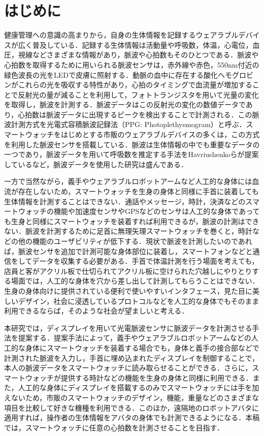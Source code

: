 \documentclass[Japanese,noauthor]{dicomopapers}
\begin{document}
\section{はじめに}
\label{introduction}
健康管理への意識の高まりから，自身の生体情報を記録するウェアラブルデバイスが広く普及している．記録する生体情報は活動量や呼吸数，体温，心電位，血圧，視線などさまざまな情報があり，脈波や心拍数もそのひとつである．脈波や心拍数を取得するために用いられる脈波センサは，赤外線や赤色，550nm付近の緑色波長の光をLEDで皮膚に照射する．動脈の血中に存在する酸化ヘモグロビンがこれらの光を吸収する特性があり，心拍のタイミングで血流量が増加することで反射光の量が減ることを利用して，フォトトランジスタを用いて光量の変化を取得し，脈波を計測する．脈波データはこの反射光の変化の数値データであり，心拍数は脈波データに出現するピークを検出することで計測される．この脈波計測方式を光電式容積脈波記録法（PPG: Photoplethysmogram）と呼ぶ．スマートウォッチをはじめとする市販のウェアラブルデバイスの多くは，この方式を利用した脈波センサを搭載している．脈波は生体情報の中でも重要なデータの一つであり，脈波データを用いて呼吸数を推定する手法をHavriushenkoら\cite{respiratory_rate_estimation}が提案しているなど，脈波データを使用した研究は盛んである．\par

一方で当然ながら，義手やウェアラブルロボットアームなど人工的な身体には血流が存在しないため，スマートウォッチを生身の身体と同様に手首に装着しても生体情報を計測することはできない．通話やメッセージ，時計，決済などのスマートウォッチの機能や加速度センサやGPSなどのセンサは人工的な身体であっても生身と同様にスマートウォッチを装着すれば利用できるが，脈波の計測はできない．脈波を計測するために足首に無理矢理スマートウォッチを巻くと，時計などの他の機能のユーザビリティが低下する．現状で脈波を計測したいのであれば，脈波センサを追加で計測可能な身体部位に装着し，スマートフォンなどと通信をしてデータを収集する必要がある．手首で体温計測を行う場面を考えても，店員と客がアクリル板で仕切られてアクリル板に空けられた穴越しにやりとりする場面では，人工的な身体を穴から差し出して計測してもらうことはできない．生身の身体向けに提供されている便利で使いやすいインタフェース，見た目に美しいデザイン，社会に浸透しているプロトコルなどを人工的な身体でもそのまま利用できるならば，そのような社会が望ましいと考える．\par

本研究では，ディスプレイを用いて光電脈波センサに脈波データを計測させる手法を提案する．提案手法によって，義手やウェアラブルロボットアームなどの人工的な身体にスマートウォッチを装着する場合でも，身体と義手の接合部などで計測された脈波を入力し，手首に埋め込まれたディスプレイを制御することで，本人の脈波データをスマートウォッチに読み取らせることができる．さらに，スマートウォッチが提供する時計などの機能を生身の身体と同様に利用できる．また，人工的な身体にディスプレイを搭載するのみでスマートウォッチには手を加えないため，市販のスマートウォッチのデザイン，機能，重量などのさまざまな項目を比較して好きな機種を利用できる．このほか，遠隔地のロボットアバタに適用すれば，操作者の生体情報をアバタの身体でも計測できるようになる．本稿では，スマートウォッチに任意の心拍数を計測させることを目指す．\par
\end{document}
